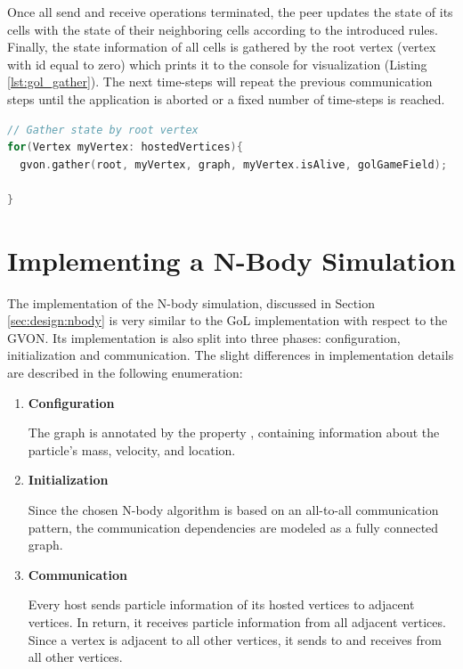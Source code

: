 \noindent Once all send and receive operations terminated, the peer
updates the state of its cells with the state of their
neighboring cells according to the introduced rules. Finally, the
state information of all cells is gathered by the root vertex (vertex
with id equal to zero) which prints it to the console for visualization (Listing
\ref{lst:gol_gather}). The next time-steps will repeat the
previous communication steps until the application is aborted or a
fixed number of time-steps is reached.

\begin{lstlisting}[language=C++, label=lst:gol_gather, caption={\ } ]
// Gather state by root vertex
for(Vertex myVertex: hostedVertices){
  gvon.gather(root, myVertex, graph, myVertex.isAlive, golGameField);

}
\end{lstlisting}


\section{Implementing a N-Body Simulation}
\label{sec:impl:nbody}


The implementation of the N-body simulation, discussed in Section
\ref{sec:design:nbody} is very similar to the GoL
implementation with respect to the GVON. Its implementation is
also split into three phases: configuration, initialization and
communication. The slight differences in implementation details are
described in the following enumeration:

\begin{enumerate}
\item \textbf{Configuration}

  The graph is annotated by the property , containing
  information about the particle's mass, velocity, and location.

\item \textbf{Initialization}

  Since the chosen N-body algorithm is
  based on an all-to-all communication pattern, the communication
  dependencies are modeled as a fully connected graph.

\item \textbf{Communication}

  Every host sends particle information
  of its hosted vertices to adjacent vertices. In return, it receives
  particle information from all adjacent vertices. Since a vertex is
  adjacent to all other vertices, it sends to and receives from
  all other vertices.
\end{enumerate}

